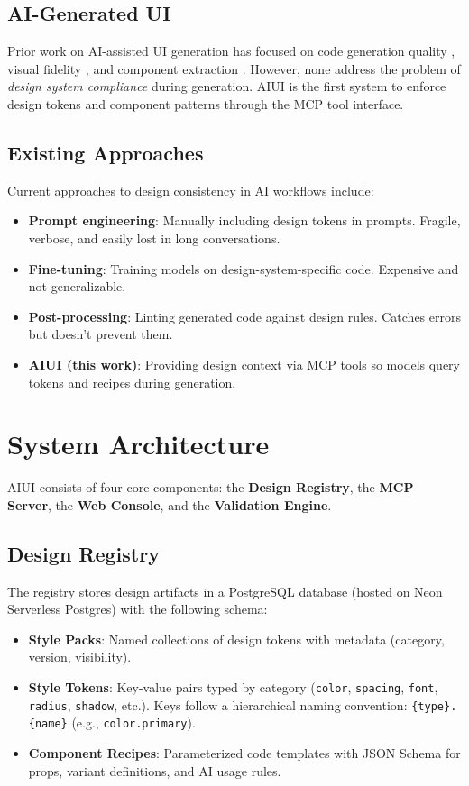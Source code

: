 \documentclass[11pt,twocolumn]{article}
\begin{document}
\subsection{AI-Generated UI}
Prior work on AI-assisted UI generation has focused on code generation quality \cite{copilot2023}, visual fidelity \cite{screenshot2code2024}, and component extraction \cite{uizard2023}. However, none address the problem of \textit{design system compliance} during generation. AIUI is the first system to enforce design tokens and component patterns through the MCP tool interface.

\subsection{Existing Approaches}
Current approaches to design consistency in AI workflows include:
\begin{itemize}[nosep]
  \item \textbf{Prompt engineering}: Manually including design tokens in prompts. Fragile, verbose, and easily lost in long conversations.
  \item \textbf{Fine-tuning}: Training models on design-system-specific code. Expensive and not generalizable.
  \item \textbf{Post-processing}: Linting generated code against design rules. Catches errors but doesn't prevent them.
  \item \textbf{AIUI (this work)}: Providing design context via MCP tools so models query tokens and recipes during generation.
\end{itemize}

\section{System Architecture}

AIUI consists of four core components: the \textbf{Design Registry}, the \textbf{MCP Server}, the \textbf{Web Console}, and the \textbf{Validation Engine}.

\subsection{Design Registry}
The registry stores design artifacts in a PostgreSQL database (hosted on Neon Serverless Postgres) with the following schema:

\begin{itemize}[nosep]
  \item \textbf{Style Packs}: Named collections of design tokens with metadata (category, version, visibility).
  \item \textbf{Style Tokens}: Key-value pairs typed by category (\texttt{color}, \texttt{spacing}, \texttt{font}, \texttt{radius}, \texttt{shadow}, etc.). Keys follow a hierarchical naming convention: \texttt{\{type\}.\{name\}} (e.g., \texttt{color.primary}).
  \item \textbf{Component Recipes}: Parameterized code templates with JSON Schema for props, variant definitions, and AI usage rules.
\end{itemize}
\end{document}
